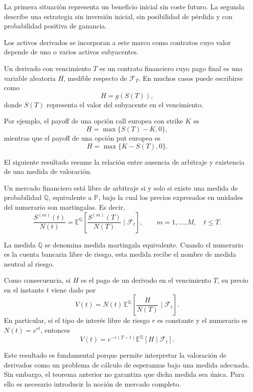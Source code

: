 La primera situación representa un beneficio inicial sin coste futuro. La segunda describe una estrategia sin inversión inicial, sin posibilidad de pérdida y con probabilidad positiva de ganancia.

Los activos derivados se incorporan a este marco como contratos cuyo valor depende de uno o varios activos subyacentes.

\begin{definition}
\label{def:derivado}
Un derivado con vencimiento \(T\) es un contrato financiero cuyo pago final es una variable aleatoria \(H\), medible respecto de \(\mathcal{F}_T\). En muchos casos puede escribirse como
\[
H=g(S(T)),
\]
donde \(S(T)\) representa el valor del subyacente en el vencimiento.
\end{definition}

Por ejemplo, el payoff de una opción call europea con strike \(K\) es
\[
H=\max\{S(T)-K,0\},
\]
mientras que el payoff de una opción put europea es
\[
H=\max\{K-S(T),0\}.
\]

El siguiente resultado resume la relación entre ausencia de arbitraje y existencia de una medida de valoración.

\begin{theorem}
\label{th:primer-teorema-fundamental}
Un mercado financiero está libre de arbitraje si y solo si existe una medida de probabilidad \(\mathbb{Q}\), equivalente a \(\mathbb{P}\), bajo la cual los precios expresados en unidades del numerario son martingalas. Es decir,
\[
\frac{S^{(m)}(t)}{N(t)}
=
\mathbb{E}^{\mathbb{Q}}\left[
\frac{S^{(m)}(T)}{N(T)}
\mid \mathcal{F}_t
\right],
\qquad m=1,\ldots,M,\quad t\leq T.
\]
\end{theorem}

La medida \(\mathbb{Q}\) se denomina medida martingala equivalente. Cuando el numerario es la cuenta bancaria libre de riesgo, esta medida recibe el nombre de medida neutral al riesgo.

Como consecuencia, si \(H\) es el pago de un derivado en el vencimiento \(T\), su precio en el instante \(t\) viene dado por
\[
V(t)
=
N(t)\,
\mathbb{E}^{\mathbb{Q}}\left[
\frac{H}{N(T)}
\mid \mathcal{F}_t
\right].
\]
En particular, si el tipo de interés libre de riesgo \(r\) es constante y el numerario es \(N(t)=e^{rt}\), entonces
\[
V(t)
=
e^{-r(T-t)}
\mathbb{E}^{\mathbb{Q}}\left[
H\mid \mathcal{F}_t
\right].
\]

Este resultado es fundamental porque permite interpretar la valoración de derivados como un problema de cálculo de esperanzas bajo una medida adecuada. Sin embargo, el teorema anterior no garantiza que dicha medida sea única. Para ello es necesario introducir la noción de mercado completo.

